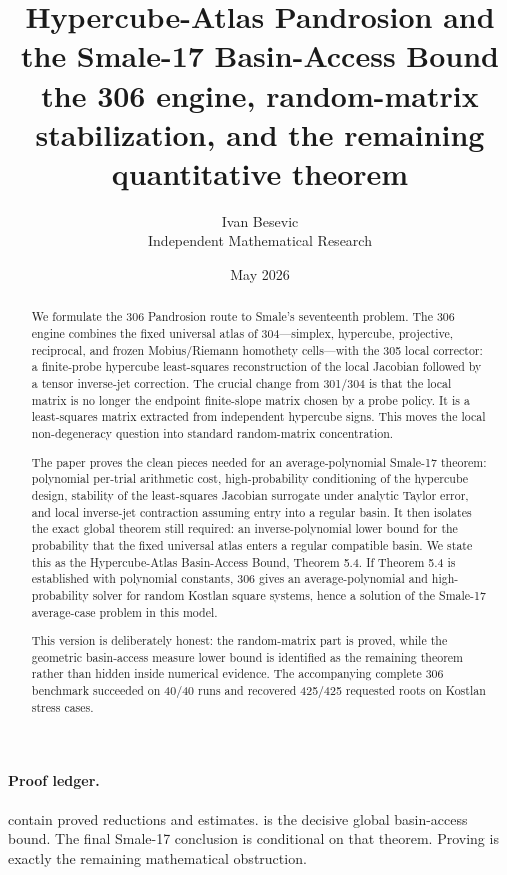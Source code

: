 \documentclass[11pt]{article}
\title{Hypercube-Atlas Pandrosion and the Smale-17 Basin-Access Bound\\[3pt]
\large the 306 engine, random-matrix stabilization, and the remaining quantitative theorem}
\author{Ivan Besevic\\Independent Mathematical Research}
\date{May 2026}
\begin{document}
\maketitle

\begin{abstract}
We formulate the 306 Pandrosion route to Smale's seventeenth problem.  The 306 engine combines the fixed universal atlas of 304---simplex, hypercube, projective, reciprocal, and frozen Mobius/Riemann homothety cells---with the 305 local corrector: a finite-probe hypercube least-squares reconstruction of the local Jacobian followed by a tensor inverse-jet correction.  The crucial change from 301/304 is that the local matrix is no longer the endpoint finite-slope matrix chosen by a probe policy.  It is a least-squares matrix extracted from independent hypercube signs.  This moves the local non-degeneracy question into standard random-matrix concentration.

The paper proves the clean pieces needed for an average-polynomial Smale-17 theorem: polynomial per-trial arithmetic cost, high-probability conditioning of the hypercube design, stability of the least-squares Jacobian surrogate under analytic Taylor error, and local inverse-jet contraction assuming entry into a regular basin.  It then isolates the exact global theorem still required: an inverse-polynomial lower bound for the probability that the fixed universal atlas enters a regular compatible basin.  We state this as the Hypercube-Atlas Basin-Access Bound, Theorem 5.4.  If Theorem 5.4 is established with polynomial constants, 306 gives an average-polynomial and high-probability solver for random Kostlan square systems, hence a solution of the Smale-17 average-case problem in this model.

This version is deliberately honest: the random-matrix part is proved, while the geometric basin-access measure lower bound is identified as the remaining theorem rather than hidden inside numerical evidence.  The accompanying complete 306 benchmark succeeded on 40/40 runs and recovered 425/425 requested roots on Kostlan stress cases.
\end{abstract}

\paragraph{Proof ledger.}
 contain proved reductions and estimates.   is the decisive global basin-access bound.  The final Smale-17 conclusion is conditional on that theorem.  Proving  is exactly the remaining mathematical obstruction.
\end{document}
